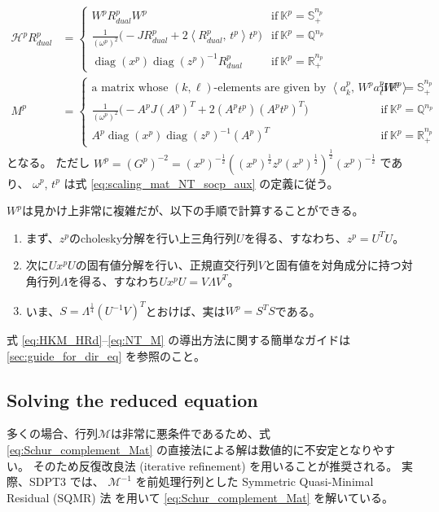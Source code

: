 \documentclass{jsarticle}
\newcommand{\inprod}[2]{\left\langle #1, \, #2 \right\rangle}
\begin{document}
\begin{align}
    \mathcal{H}^p R^p_{dual} &= \begin{cases}
        W^p R^p_{dual} W^p & \text{if} ~ \mathbb{K}^p=\mathbb{S}^{n_p}_+ \\
        \frac{1}{(\omega^p)^2} \Big(-J R^p_{dual} + 2\inprod{R^p_{dual}}{t^p}t^p\Big) & \text{if} ~ \mathbb{K}^p=\mathbb{Q}^{n_p}\\
        \operatorname{diag}(x^p) \operatorname{diag}(z^p)^{-1} R^p_{dual} & \text{if} ~ \mathbb{K}^p=\mathbb{R}^{n_p}_+
    \end{cases} \label{eq:NT_HRd}\\
    M^p &= \begin{cases}
        \text{a matrix whose $(k,\ell)$-elements are given by } \inprod{a^p_k}{W^p a^p_\ell W^p} & \text{if} ~ \mathbb{K}^p=\mathbb{S}^{n_p}_+\\
        \frac{1}{(\omega^p)^2}\Big(-A^p J (A^p)^T + 2 (A^p t^p)(A^p t^p)^T \Big) & \text{if} ~ \mathbb{K}^p=\mathbb{Q}^{n_p} \\
        A^p \operatorname{diag}(x^p) \operatorname{diag}(z^p)^{-1} (A^p)^T & \text{if} ~ \mathbb{K}^p=\mathbb{R}^{n_p}_+
    \end{cases} \label{eq:NT_M}
\end{align}
となる。
ただし $W^p = (G^p)^{-2} = (x^p)^{-\frac{1}{2}}((x^p)^{\frac{1}{2}} z^p (x^p)^{\frac{1}{2}})^{\frac{1}{2}} (x^p)^{-\frac{1}{2}}$ であり、 $\omega^p$, $t^p$ は式 \eqref{eq:scaling_mat_NT_socp_aux} の定義に従う。

$W^p$は見かけ上非常に複雑だが、以下の手順で計算することができる\cite{todd1998}。
\begin{enumerate}
    \item まず、$z^p$のcholesky分解を行い上三角行列$U$を得る、すなわち、$z^p=U^TU$。
    \item 次に$U x^p U$の固有値分解を行い、正規直交行列$V$と固有値を対角成分に持つ対角行列$\Lambda$を得る、すなわち$U x^p U = V \Lambda V^T$。
    \item いま、$S=\Lambda^\frac{1}{4}(U^{-1}V)^T$とおけば、実は$W^p=S^T S$である。
\end{enumerate}

式 \eqref{eq:HKM_HRd}--\eqref{eq:NT_M} の導出方法に関する簡単なガイドは \ref{sec:guide_for_dir_eq} を参照のこと。



\subsection{Solving the reduced equation}
多くの場合、行列$\mathcal{M}$は非常に悪条件であるため、式 \eqref{eq:Schur_complement_Mat} の直接法による解は数値的に不安定となりやすい。
そのため反復改良法 (iterative refinement) を用いることが推奨される。
実際、SDPT3 \cite{toh1999} では、 $\mathcal{M}^{-1}$ を前処理行列とした Symmetric Quasi-Minimal Residual (SQMR) 法 \cite{Freund1994} を用いて \eqref{eq:Schur_complement_Mat} を解いている。
\end{document}
